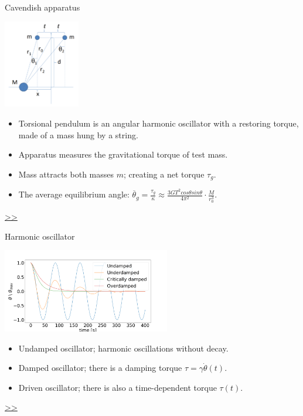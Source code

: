 \documentclass{beamer}
\begin{document}
\begin{frame}{\hypertarget{frame:Cavendish apparatus}{Cavendish apparatus}}
	\begin{center}		
		\includegraphics[width=0.25\textwidth,keepaspectratio]{Cavendish apparatus.PNG}
    \end{center}
	\begin{itemize}
		\item Torsional pendulum is an angular harmonic oscillator with a restoring torque, made of a mass hung by a string. 
		\item Apparatus measures the gravitational torque of test mass.
		\item Mass attracts both masses $m$; creating a net torque $\tau_g$.
		\item The average equilibrium angle: $\overline{\theta}_g = \frac{\tau_g}{\kappa} \approx \frac{3GT^2cos\theta sin\theta}{4\pi^2 } \cdot \frac{M}{r_0^3}$.

	\end{itemize}
	\hyperlink{frame:Cavendish apparatus 1}{>>} 
\end{frame}

\begin{frame}{\hypertarget{frame:Harmonic oscillator}{Harmonic oscillator}}
	\begin{center}		
		\includegraphics[width=0.55\textwidth,keepaspectratio]{damp.png}
    \end{center}
	\begin{itemize}

		\item Undamped oscillator; harmonic oscillations without decay.
		\item Damped oscillator; there is a damping torque $\tau = \gamma\dot{\theta}(t)$.
		\item Driven oscillator; there is also a time-dependent torque $\tau(t)$.
		
	\end{itemize}
	\hyperlink{frame:Damped oscillator}{>>}
\end{frame}
\end{document}
